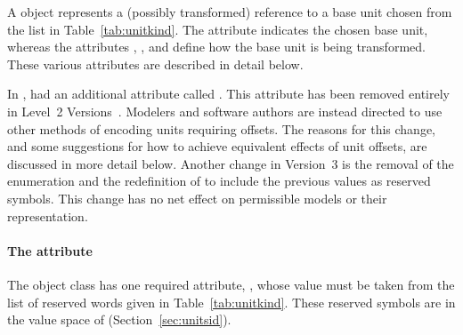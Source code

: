 A \Unit object represents a (possibly transformed) reference to
a base unit chosen from the list in
  Table~\vref{tab:unitkind}.  The attribute
 indicates the chosen base unit, whereas the
attributes , , and
 define how the base unit is being transformed.
These various attributes are described in detail below.

In \sbmltwoone, \Unit had an additional
attribute called .  This
attribute has been removed entirely in Level~2
Versions~.  Modelers and software authors are
instead directed to use other methods of encoding units requiring
offsets.  The reasons for this change, and some suggestions for
how to achieve equivalent effects of unit offsets, are discussed
in more detail below.  Another change in Version~3  is the
  removal of the enumeration  and the
  redefinition of  to include the previous
   values as reserved symbols.  This change has
  no net effect on permissible models or their representation.


\paragraph{The  attribute}



The \Unit object class has one required attribute,
, whose value must be taken from the list of reserved
words given in Table~\vref{tab:unitkind}.  These reserved
  symbols are in the value space of 
  (Section~\ref{sec:unitsid}).

